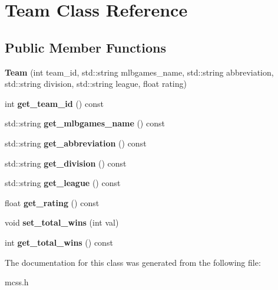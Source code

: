 \hypertarget{classTeam}{}\section{Team Class Reference}
\label{classTeam}
\subsection*{Public Member Functions}
\begin{DoxyCompactItemize}
\item 
{\bfseries Team} (int team\+\_\+id, std\+::string mlbgames\+\_\+name, std\+::string abbreviation, std\+::string division, std\+::string league, float rating)\hypertarget{classTeam_afc2ffd349d3f4178b6b8be5ac7c03d90}{}\label{classTeam_afc2ffd349d3f4178b6b8be5ac7c03d90}

\item 
int {\bfseries get\+\_\+team\+\_\+id} () const \hypertarget{classTeam_ac6ca2c2262b9d5a513e94575ca455ad0}{}\label{classTeam_ac6ca2c2262b9d5a513e94575ca455ad0}

\item 
std\+::string {\bfseries get\+\_\+mlbgames\+\_\+name} () const \hypertarget{classTeam_ac12231bf5ace340d8647e31a03f817d9}{}\label{classTeam_ac12231bf5ace340d8647e31a03f817d9}

\item 
std\+::string {\bfseries get\+\_\+abbreviation} () const \hypertarget{classTeam_a831eeaa541278c8bec7494f31a18b9b5}{}\label{classTeam_a831eeaa541278c8bec7494f31a18b9b5}

\item 
std\+::string {\bfseries get\+\_\+division} () const \hypertarget{classTeam_aae3fadd5190cd0b392e1da6326b220dc}{}\label{classTeam_aae3fadd5190cd0b392e1da6326b220dc}

\item 
std\+::string {\bfseries get\+\_\+league} () const \hypertarget{classTeam_a2c1e90db2a09d04d27e98b107f34a6fb}{}\label{classTeam_a2c1e90db2a09d04d27e98b107f34a6fb}

\item 
float {\bfseries get\+\_\+rating} () const \hypertarget{classTeam_a1056f7763e7c03c6742ea10fe13056fa}{}\label{classTeam_a1056f7763e7c03c6742ea10fe13056fa}

\item 
void {\bfseries set\+\_\+total\+\_\+wins} (int val)\hypertarget{classTeam_a467ca8e9755535a394818d473e2ccff3}{}\label{classTeam_a467ca8e9755535a394818d473e2ccff3}

\item 
int {\bfseries get\+\_\+total\+\_\+wins} () const \hypertarget{classTeam_a44c5f744acec3377807e74c56ae96ab1}{}\label{classTeam_a44c5f744acec3377807e74c56ae96ab1}

\end{DoxyCompactItemize}


The documentation for this class was generated from the following file\+:\begin{DoxyCompactItemize}
\item 
mcss.\+h\end{DoxyCompactItemize}
